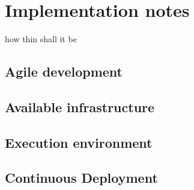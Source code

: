 \chapter{Implementation notes}


how thin shall it be


\section{Agile development}

\section{Available infrastructure}

\section{Execution environment}

\section{Continuous Deployment}
